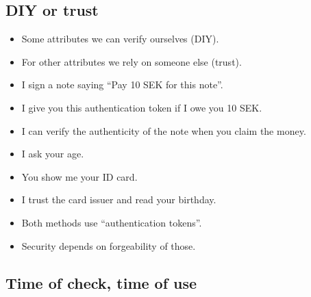 \subsection{DIY or trust}

\begin{frame}
  \begin{itemize}
    \item Some attributes we can verify ourselves (\ie DIY).
    \item For other attributes we rely on someone else (\ie trust).
  \end{itemize}
\end{frame}

\begin{frame}
  \begin{example}
    \begin{itemize}
      \item I sign a note saying \enquote{Pay 10 SEK for this note}.
      \item I give you this authentication token if I owe you 10 SEK.
      \item I can verify the authenticity of the note when you claim the money.
    \end{itemize}
  \end{example}

  \pause

  \begin{example}
    \begin{itemize}
      \item I ask your age.
      \item You show me your ID card.
      \item I trust the card issuer and read your birthday.
    \end{itemize}
  \end{example}
\end{frame}

\begin{frame}
  \begin{remark}
    \begin{itemize}
      \item Both methods use \enquote{authentication tokens}.
      \item Security depends on forgeability of those.
    \end{itemize}
  \end{remark}
\end{frame}

\subsection{Time of check, time of use}

